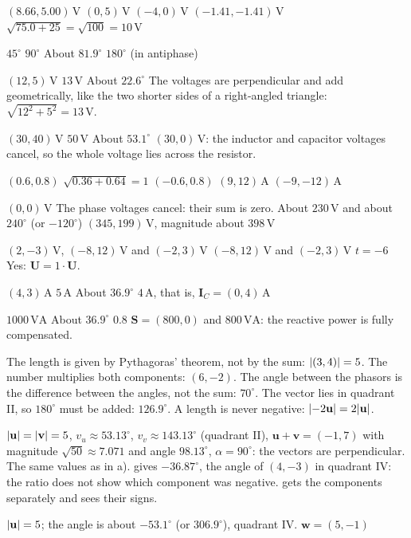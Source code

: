 \begin{facit}
  $(8.66, 5.00)\,\text{V}$  $(0, 5)\,\text{V}$  $(-4, 0)\,\text{V}$
 $(-1.41, -1.41)\,\text{V}$  $\sqrt{75.0 + 25} = \sqrt{100} = 10\,\text{V}$

  $45^{\circ}$  $90^{\circ}$  About $81.9^{\circ}$
 $180^{\circ}$ (in antiphase)

  $(12, 5)\,\text{V}$  $13\,\text{V}$  About $22.6^{\circ}$
 The voltages are perpendicular and add geometrically, like the two shorter sides of a
right-angled triangle: $\sqrt{12^2 + 5^2} = 13\,\text{V}$.

  $(30, 40)\,\text{V}$  $50\,\text{V}$  About $53.1^{\circ}$
 $(30, 0)\,\text{V}$: the inductor and capacitor voltages cancel, so the whole voltage
lies across the resistor.

  $(0.6, 0.8)$  $\sqrt{0.36 + 0.64} = 1$
 $(-0.6, 0.8)$  $(9, 12)\,\text{A}$  $(-9, -12)\,\text{A}$

  $(0, 0)\,\text{V}$
 The phase voltages cancel: their sum is zero.
 About $230\,\text{V}$ and about $240^{\circ}$ (or $-120^{\circ}$)
 $(345, 199)\,\text{V}$, magnitude about $398\,\text{V}$

  $(2, -3)\,\text{V}$, $(-8, 12)\,\text{V}$ and $(-2, 3)\,\text{V}$
 $(-8, 12)\,\text{V}$ and $(-2, 3)\,\text{V}$
 $t = -6$
 Yes: $\mathbf{U} = 1 \cdot \mathbf{U}$.

  $(4, 3)\,\text{A}$  $5\,\text{A}$  About $36.9^{\circ}$
 $4\,\text{A}$, that is, $\mathbf{I}_C = (0, 4)\,\text{A}$

  $1000\,\text{VA}$  About $36.9^{\circ}$  $0.8$
 $\mathbf{S} = (800, 0)$ and $800\,\text{VA}$: the reactive power is fully compensated.

  The length is given by Pythagoras' theorem, not by the sum: $\lvert(3, 4)\rvert = 5$.
 The number multiplies both components: $(6, -2)$.
 The angle between the phasors is the difference between the angles, not the sum: $70^{\circ}$.
 The vector lies in quadrant II, so $180^{\circ}$ must be added: $126.9^{\circ}$.
 A length is never negative: $\lvert-2\mathbf{u}\rvert = 2\lvert\mathbf{u}\rvert$.

  $\lvert\mathbf{u}\rvert = \lvert\mathbf{v}\rvert = 5$, $v_u \approx 53.13^{\circ}$,
$v_v \approx 143.13^{\circ}$ (quadrant II), $\mathbf{u} + \mathbf{v} = (-1, 7)$ with magnitude
$\sqrt{50} \approx 7.071$ and angle $98.13^{\circ}$, $\alpha = 90^{\circ}$: the vectors are
perpendicular.
 The same values as in a).
  gives $-36.87^{\circ}$, the angle of $(4, -3)$ in quadrant IV: the
ratio does not show which component was negative.  gets the components
separately and sees their signs.

  $\lvert\mathbf{u}\rvert = 5$; the angle is about $-53.1^{\circ}$ (or
$306.9^{\circ}$), quadrant IV.
 $\mathbf{w} = (5, -1)$

\end{facit}
